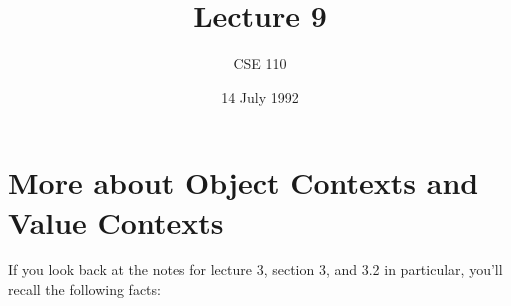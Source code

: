 %
%
%


\def\brac#1{$<$#1$>$}
\def\Int{{\tt int}}
\def\int{\brac{\Int}}
\def\int{\brac{\Int}}
\def\Shortint{{\tt short~int}}
\def\shortint{\brac{\Shortint}}
\def\Longint{{\tt long~int}}
\def\longint{\brac{\Longint}}
\def\Float{{\tt float}}
\def\float{\brac{\Float}}
\def\Double{{\tt double}}
\def\double{\brac{\Double}}
\def\Char{{\tt char}}
\def\chr{\brac{\Char}}
\def\Void{{\tt void}}
\def\void{\brac{\Void}}

\def\p2#1{\brac{pointer~to #1}}

\def\breakhere{\mbox{$\otimes$}}
\parskip 8pt


\title{Lecture 9}
\author{CSE 110}
\date{14 July 1992}

\pagestyle{fancy}
\rhead{\thepage}
\cfoot{}





\maketitle

\section{More about Object Contexts and Value Contexts}


If you look back at the notes for lecture 3, section 3, and 3.2 in
particular, you'll recall the following facts:

